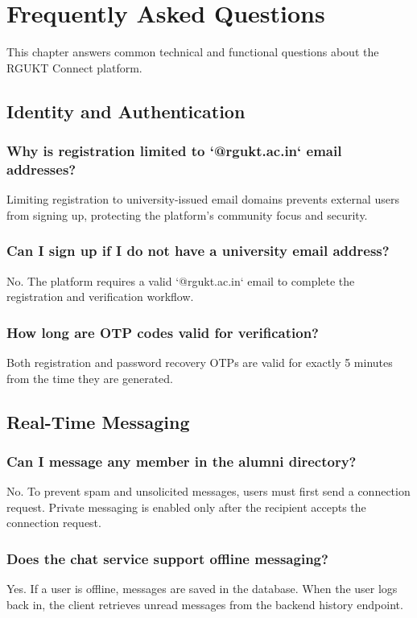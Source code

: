 \chapter{Frequently Asked Questions}
\label{ch:faq}

This chapter answers common technical and functional questions about the RGUKT Connect platform.

\section{Identity and Authentication}

\subsection{Why is registration limited to `@rgukt.ac.in` email addresses?}
Limiting registration to university-issued email domains prevents external users from signing up, protecting the platform's community focus and security.

\subsection{Can I sign up if I do not have a university email address?}
No. The platform requires a valid `@rgukt.ac.in` email to complete the registration and verification workflow.

\subsection{How long are OTP codes valid for verification?}
Both registration and password recovery OTPs are valid for exactly 5 minutes from the time they are generated.

\section{Real-Time Messaging}

\subsection{Can I message any member in the alumni directory?}
No. To prevent spam and unsolicited messages, users must first send a connection request. Private messaging is enabled only after the recipient accepts the connection request.

\subsection{Does the chat service support offline messaging?}
Yes. If a user is offline, messages are saved in the database. When the user logs back in, the client retrieves unread messages from the backend history endpoint.

